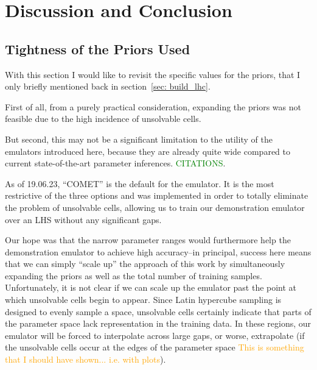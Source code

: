 \chapter{Discussion and Conclusion}
\label{chap: disc_and_conc}

\section{Tightness of the Priors Used}
\label{sec: prior_woes}

With this section I would like to revisit the specific values for the priors,
that I only briefly mentioned back in section~\ref{sec: build_lhc}.

First of all, from a purely practical consideration, expanding the priors was
not feasible due to the high incidence of unsolvable cells.

But second, this may not be a significant limitation to the utility of the
emulators introduced here, because they are already quite wide compared to
current state-of-the-art parameter inferences. \textcolor{green}{CITATIONS}.

As of 19.06.23, ``COMET'' is the default for the emulator. It is the most 
restrictive of the three options and was implemented in order to totally 
eliminate the problem of unsolvable cells, allowing us to train our 
demonstration emulator over an LHS without any significant gaps.

Our hope was that the narrow parameter ranges would furthermore help the 
demonstration emulator to achieve high accuracy--in principal, success here
means that we can simply ``scale up'' the approach of this work by
simultaneously expanding the priors as well as the total number of training
samples. Unfortunately, it is not clear if we can scale up the emulator past
the point at which unsolvable cells begin to appear. Since Latin hypercube
sampling is designed to evenly sample a space, unsolvable cells certainly
indicate that parts of the parameter space lack representation in the training
data. In these regions, our emulator will be forced to interpolate across
large gaps, or worse, extrapolate (if the unsolvable cells occur at the edges
of the parameter space \textcolor{orange}{This is something that I should have
shown... i.e. with plots}).

